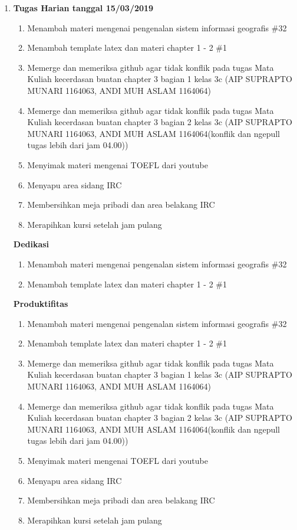 \begin{enumerate}
\item \textbf{Tugas Harian tanggal 15/03/2019}
\begin{enumerate}
\item Menambah materi mengenai pengenalan sistem informasi geografis \#32
\item Menambah template latex dan materi chapter 1 - 2 \#1
\item Memerge dan memeriksa github agar tidak konflik pada tugas Mata Kuliah kecerdasan buatan chapter 3 bagian 1 kelas 3c (AIP SUPRAPTO MUNARI 1164063, ANDI MUH ASLAM 1164064)
\item Memerge dan memeriksa github agar tidak konflik pada tugas Mata Kuliah kecerdasan buatan chapter 3 bagian 2 kelas 3c (AIP SUPRAPTO MUNARI 1164063, ANDI MUH ASLAM 1164064(konflik dan ngepull tugas lebih dari jam 04.00))
\item Menyimak materi mengenai TOEFL dari youtube
\item Menyapu area sidang IRC
\item Membersihkan meja pribadi dan area belakang IRC
\item Merapihkan kursi setelah jam pulang 
\end{enumerate}

\textbf{Dedikasi}
\begin{enumerate}
\item Menambah materi mengenai pengenalan sistem informasi geografis \#32
\item Menambah template latex dan materi chapter 1 - 2 \#1
\end{enumerate}

\textbf{Produktifitas}
\begin{enumerate}
\item Menambah materi mengenai pengenalan sistem informasi geografis \#32
\item Menambah template latex dan materi chapter 1 - 2 \#1
\item Memerge dan memeriksa github agar tidak konflik pada tugas Mata Kuliah kecerdasan buatan chapter 3 bagian 1 kelas 3c (AIP SUPRAPTO MUNARI 1164063, ANDI MUH ASLAM 1164064)
\item Memerge dan memeriksa github agar tidak konflik pada tugas Mata Kuliah kecerdasan buatan chapter 3 bagian 2 kelas 3c (AIP SUPRAPTO MUNARI 1164063, ANDI MUH ASLAM 1164064(konflik dan ngepull tugas lebih dari jam 04.00))
\item Menyimak materi mengenai TOEFL dari youtube
\item Menyapu area sidang IRC
\item Membersihkan meja pribadi dan area belakang IRC
\item Merapihkan kursi setelah jam pulang 
\end{enumerate}


\end{enumerate}
